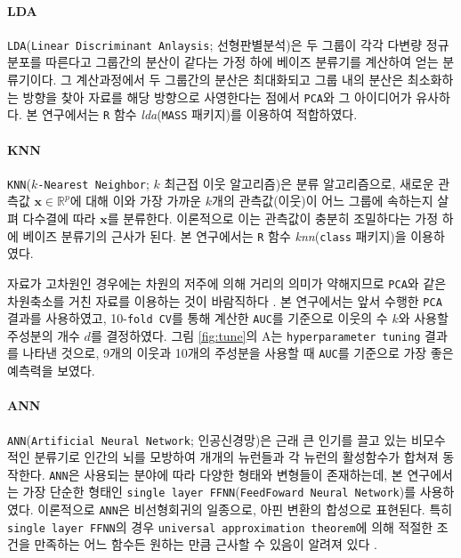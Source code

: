 \documentclass[10pt,onecolumn,twoside,a4size]{gsag3jnl}
\begin{document}
\paragraph{LDA} 

\texttt{LDA}(\texttt{Linear Discriminant Anlaysis}; 선형판별분석)은 두 그룹이 각각 다변량 정규분포를 따른다고 그룹간의 분산이 같다는 가정 하에 베이즈 분류기를 계산하여 얻는 분류기이다. 그 계산과정에서 두 그룹간의 분산은 최대화되고 그룹 내의 분산은 최소화하는 방향을 찾아 자료를 해당 방향으로 사영한다는 점에서 \texttt{PCA}와 그 아이디어가 유사하다. 본 연구에서는 \texttt{R} 함수 \textit{lda}(\texttt{MASS} 패키지)를 이용하여 적합하였다.

\paragraph{KNN}

\texttt{KNN}(\texttt{$k$-Nearest Neighbor}; $k$ 최근접 이웃 알고리즘)은 분류 알고리즘으로, 새로운 관측값 $\mathbf{x}\in\mathbb{R}^p$에 대해 이와 가장 가까운 $k$개의 관측값(이웃)이 어느 그룹에 속하는지 살펴 다수결에 따라 $\mathbf{x}$를 분류한다. 이론적으로 이는 관측값이 충분히 조밀하다는 가정 하에 베이즈 분류기의 근사가 된다. 본 연구에서는 \texttt{R} 함수 \textit{knn}(\texttt{class} 패키지)을 이용하였다.

자료가 고차원인 경우에는 차원의 저주에 의해 거리의 의미가 약해지므로 \texttt{PCA}와 같은 차원축소를 거친 자료를 이용하는 것이 바람직하다 \texttt{\citep{beyer1999nearest}}. 본 연구에서는 앞서 수행한 \texttt{PCA} 결과를 사용하였고, 10-\texttt{fold CV}를 통해 계산한 \texttt{AUC}를 기준으로 이웃의 수 $k$와 사용할 주성분의 개수 $d$를 결정하였다. 그림 \ref{fig:tune}의 A는 \texttt{hyperparameter tuning} 결과를 나타낸 것으로, 9개의 이웃과 10개의 주성분을 사용할 때 \texttt{AUC}를 기준으로 가장 좋은 예측력을 보였다.

\paragraph{ANN}

\texttt{ANN}(\texttt{Artificial Neural Network}; 인공신경망)은 근래 큰 인기를 끌고 있는 비모수적인 분류기로 인간의 뇌를 모방하여 개개의 뉴런들과 각 뉴런의 활성함수가 합쳐져 동작한다. \texttt{ANN}은 사용되는 분야에 따라 다양한 형태와 변형들이 존재하는데, 본 연구에서는 가장 단순한 형태인 \texttt{single layer FFNN}(\texttt{FeedFoward Neural Network})를 사용하였다. 이론적으로 \texttt{ANN}은 비선형회귀의 일종으로, 아핀 변환의 합성으로 표현된다. 특히 \texttt{single layer FFNN}의 경우 \texttt{universal approximation theorem}에 의해 적절한 조건을 만족하는 어느 함수든 원하는 만큼 근사할 수 있음이 알려져 있다 \texttt{\citep{leshno1993multilayer}}.
\end{document}
